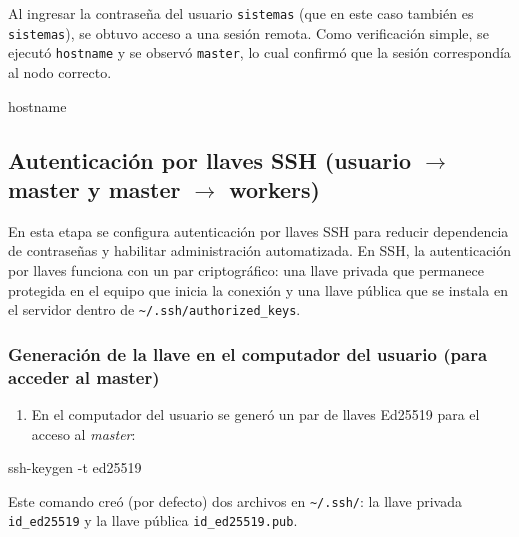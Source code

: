 Al ingresar la contraseña del usuario \texttt{sistemas} (que en este caso también es \texttt{sistemas}), se obtuvo acceso a una sesión remota. Como verificación simple, se ejecutó \texttt{hostname} y se observó \texttt{master}, lo cual confirmó que la sesión correspondía al nodo correcto.

\begin{terminalblock}
hostname
\end{terminalblock}


\subsection{Autenticación por llaves SSH (\texorpdfstring{usuario $\rightarrow$ master y master $\rightarrow$ workers}{usuario -> master y master -> workers})}
\label{subsec:ssh_keys}

En esta etapa se configura autenticación por llaves SSH para reducir dependencia de contraseñas y habilitar administración automatizada. En SSH, la autenticación por llaves funciona con un par criptográfico: una llave privada que permanece protegida en el equipo que inicia la conexión y una llave pública que se instala en el servidor dentro de \texttt{\textasciitilde/.ssh/authorized\_keys}. \cite{man_ssh_keygen,redhat_key_based_auth_blog,rhel_key_pairs_ssh}

\subsubsection*{Generación de la llave en el computador del usuario (para acceder al master)}
\begin{enumerate}
  \item En el computador del usuario se generó un par de llaves Ed25519 para el acceso al \textit{master}:
\end{enumerate}

\begin{terminalblock}
ssh-keygen -t ed25519
\end{terminalblock}

Este comando creó (por defecto) dos archivos en \texttt{\textasciitilde/.ssh/}: la llave privada \texttt{id\_ed25519} y la llave pública \texttt{id\_ed25519.pub}. \cite{man_ssh_keygen}

